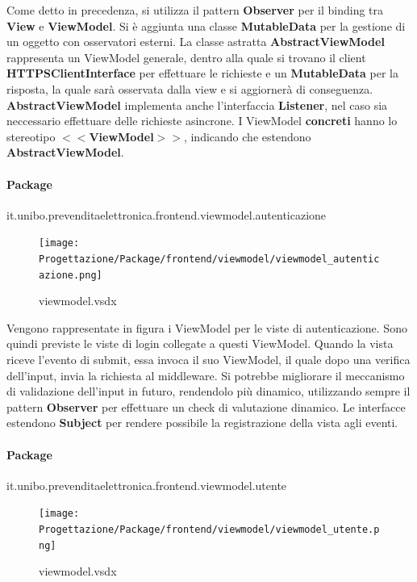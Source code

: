 \documentclass[a4paper]{article}
\begin{document}
Come detto in precedenza, si utilizza il pattern \textbf{Observer} per il binding tra \textbf{View} e \textbf{ViewModel}. Si è aggiunta una classe \textbf{MutableData} per la gestione di un oggetto con osservatori esterni. La classe astratta \textbf{AbstractViewModel} rappresenta un ViewModel generale, dentro alla quale si trovano il client \textbf{HTTPSClientInterface} per effettuare le richieste e un \textbf{MutableData} per la risposta, la quale sarà osservata dalla view e si aggiornerà di conseguenza. \textbf{AbstractViewModel} implementa anche l'interfaccia \textbf{Listener}, nel caso sia neccessario effettuare delle richieste asincrone. I ViewModel \textbf{concreti} hanno lo stereotipo $<<$\textbf{ViewModel}$>>$, indicando che estendono \textbf{AbstractViewModel}.

\newpage

\paragraph{Package} it.unibo.prevenditaelettronica.frontend.viewmodel.autenticazione


\begin{figure}[H]
    \texttt{[image: Progettazione/Package/frontend/viewmodel/viewmodel\_autenticazione.png]}
    \centering
    \caption{viewmodel.vsdx}
\end{figure}

Vengono rappresentate in figura i ViewModel per le viste di autenticazione. Sono quindi previste le viste di login collegate a questi ViewModel. Quando la vista riceve l'evento di submit, essa invoca il suo ViewModel, il quale dopo una verifica dell'input, invia la richiesta al middleware. Si potrebbe migliorare il meccanismo di validazione dell'input in futuro, rendendolo più dinamico, utilizzando sempre il pattern \textbf{Observer} per effettuare un check di valutazione dinamico. Le interfacce estendono \textbf{Subject} per rendere possibile la registrazione della vista agli eventi.

\paragraph{Package} it.unibo.prevenditaelettronica.frontend.viewmodel.utente

\begin{figure}[H]
    \texttt{[image: Progettazione/Package/frontend/viewmodel/viewmodel\_utente.png]}
    \centering
    \caption{viewmodel.vsdx}
\end{figure}
\end{document}
